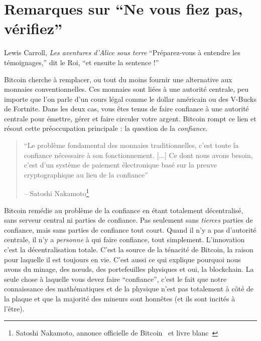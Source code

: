 \chapter{Remarques sur \enquote{Ne vous fiez pas, vérifiez}}
\label{les:16}

\begin{chapquote}{Lewis Carroll, \textit{Les aventures d’Alice sous terre}}
\enquote{Préparez-vous à entendre les témoignages,} dit le Roi, \enquote{et
ensuite la sentence !}
\end{chapquote}

Bitcoin cherche à remplacer, ou tout du moins fournir une alternative aux
monnaies conventionnelles. Ces monnaies sont liées à une autorité centrale, peu
importe que l'on parle d'un cours légal comme le dollar américain ou des V-Bucks
de Fortnite. Dans les deux cas, vous êtes tenus de faire confiance à une
autorité centrale pour émettre, gérer et faire circuler votre argent. Bitcoin
rompt ce lien et résout cette préoccupation principale : la question de la
\textit{confiance}.

\begin{quotation}\begin{samepage}
\enquote{Le problème fondamental des monnaies traditionnelles, c'est toute la
confiance nécessaire à son fonctionnement. [...] Ce dont nous avons besoin,
c'est d'un système de paiement électronique basé sur la preuve cryptographique
au lieu de la confiance}
\begin{flushright} -- Satoshi Nakamoto\footnote{Satoshi Nakamoto, annonce
officielle de Bitcoin~\cite{bitcoin-announcement} et livre
blanc~\cite{whitepaper}}
\end{flushright}\end{samepage}\end{quotation}

Bitcoin remédie au problème de la confiance en étant totalement décentralisé,
sans serveur central ni parties de confiance. Pas seulement sans
\textit{tierces} parties de confiance, mais sans parties de confiance tout
court. Quand il n'y a pas d'autorité centrale, il n'y a \textit{personne} à qui
faire confiance, tout simplement. L'innovation c'est la décentralisation totale.
C'est la source de la ténacité de Bitcoin, la raison pour laquelle il est
toujours en vie. C'est aussi ce qui explique pourquoi nous avons du minage, des
nœuds, des portefeuilles physiques et oui, la blockchain. La seule chose à
laquelle vous devez faire \enquote{confiance}, c'est le fait que notre
connaissance des mathématiques et de la physique n'est pas totalement à côté de
la plaque et que la majorité des mineurs sont honnêtes (et ils sont incités à
l'être).

